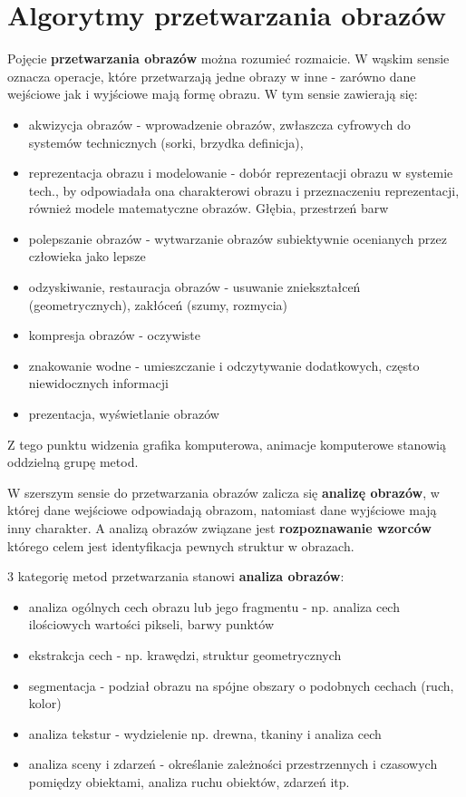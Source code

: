 \documentclass[a4paper,twoside]{report}
\begin{document}
\section{Algorytmy przetwarzania obrazów}
Pojęcie \textbf{przetwarzania obrazów} można rozumieć rozmaicie. W wąskim sensie oznacza operacje, które przetwarzają jedne obrazy w inne - zarówno dane wejściowe jak i wyjściowe mają formę obrazu. W tym sensie zawierają się:
\begin{itemize}
	\item akwizycja obrazów - wprowadzenie obrazów, zwłaszcza cyfrowych do systemów technicznych (sorki, brzydka definicja),
	\item reprezentacja obrazu i modelowanie - dobór reprezentacji obrazu w systemie tech., by odpowiadała ona charakterowi obrazu i przeznaczeniu reprezentacji, również modele matematyczne obrazów. Głębia, przestrzeń barw
	\item polepszanie obrazów - wytwarzanie obrazów subiektywnie ocenianych przez człowieka jako lepsze
	\item odzyskiwanie, restauracja obrazów - usuwanie zniekształceń (geometrycznych), zakłóceń (szumy, rozmycia)
	\item kompresja obrazów - oczywiste
	\item znakowanie wodne - umieszczanie i odczytywanie dodatkowych, często niewidocznych informacji
	\item prezentacja, wyświetlanie obrazów
\end{itemize}
	
	Z tego punktu widzenia grafika komputerowa, animacje komputerowe stanowią oddzielną grupę metod.
	
	W szerszym sensie do przetwarzania obrazów zalicza się \textbf{analizę obrazów}, w której dane wejściowe odpowiadają obrazom, natomiast dane wyjściowe mają inny charakter. A analizą obrazów związane jest \textbf{rozpoznawanie wzorców} którego celem jest identyfikacja pewnych struktur w obrazach.
	
	3 kategorię metod przetwarzania stanowi \textbf{analiza obrazów}:
\begin{itemize}
	\item analiza ogólnych cech obrazu lub jego fragmentu - np. analiza cech ilościowych wartości pikseli, barwy punktów
	\item ekstrakcja cech - np. krawędzi, struktur geometrycznych
	\item segmentacja - podział obrazu na spójne obszary o podobnych cechach (ruch, kolor)
	\item analiza tekstur - wydzielenie np. drewna, tkaniny i analiza cech
	\item analiza sceny i zdarzeń - określanie zależności przestrzennych i czasowych pomiędzy obiektami, analiza ruchu obiektów, zdarzeń itp.
\end{itemize}
\end{document}
